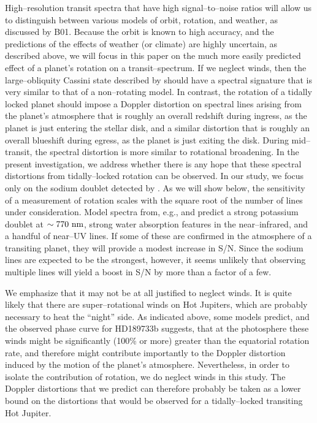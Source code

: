 \documentclass[12pt,preprint]{aastex}
\begin{document}
High--resolution transit spectra that have high signal--to--noise ratios will
allow us to distinguish between various models of orbit, rotation, and
weather, as discussed by B01.  Because the orbit is known to high
accuracy, and the predictions of the effects of weather (or climate) are
highly uncertain, as described above, we will focus in this paper on the
much more easily predicted effect of a planet's rotation on a
transit--spectrum.  If we neglect winds, then the large--obliquity Cassini
state described by \citet{winn+holman2005} should have a spectral signature
that is very similar to that of a non--rotating model.  In contrast, the
rotation of a tidally locked planet should impose a Doppler distortion
on spectral lines arising from the planet's atmosphere that
is roughly an overall redshift during ingress, as the planet is just
entering the stellar disk, and a similar distortion that is roughly an
overall blueshift during egress, as the planet is just exiting the disk.
During mid--transit, the spectral distortion is more similar to rotational
broadening.  In the present investigation, we address whether there is any
hope that these spectral distortions from tidally--locked rotation can be
observed.  In our study, we focus only on the sodium doublet detected
by \citet{charbonneau_et_al2002}.  As we will show below, the sensitivity
of a measurement of rotation scales with the square root of the number of lines
under consideration.  Model spectra from, e.g., \citet{sudarsky_et_al2003} and
\citet{barman2007} predict a strong potassium doublet at
$\sim 770 {\rm~nm}$, strong water absorption features in the near--infrared,
and a handful of near--UV lines.  If some of these are confirmed in the
atmosphere of a transiting planet, they will provide a modest
increase in S/N.  Since the sodium lines are expected to be the strongest,
however, it seems unlikely that observing multiple lines will yield a
boost in S/N by more than a factor of a few.

We emphasize that it may not be at all justified to neglect winds.  It is
quite likely that there are super--rotational winds on Hot Jupiters, which
are probably necessary to heat the ``night'' side.  As indicated above, some
models predict, and the observed phase curve for HD189733b suggests, that at
the photosphere these winds might be significantly (100\% or more) greater
than the equatorial rotation rate, and therefore might contribute
importantly to the Doppler distortion induced by the motion of the planet's
atmosphere.  Nevertheless, in order to isolate the contribution of rotation,
we do neglect winds in this study.  The Doppler distortions that we predict
can therefore probably be taken as a lower bound on the distortions that would
be observed for a tidally--locked transiting Hot Jupiter.
\end{document}
